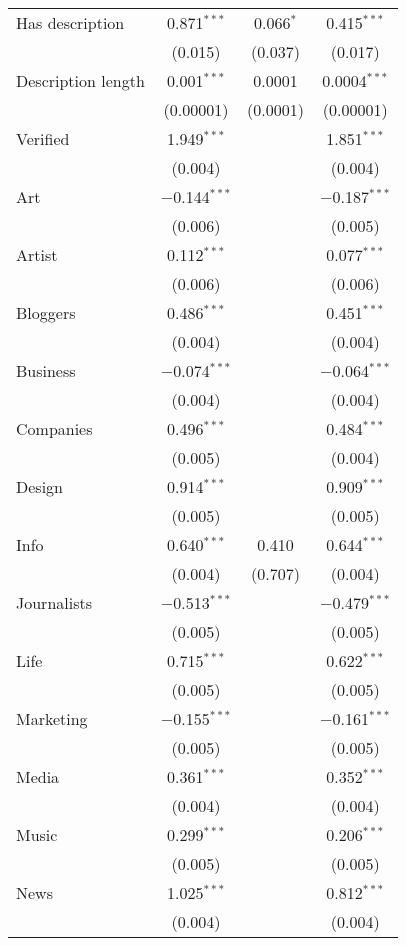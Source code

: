 \begin{table}[!htbp]
\begin{tabular}{@{\extracolsep{5pt}}lccc}
  Has description & 0.871$^{***}$ & 0.066$^{*}$ & 0.415$^{***}$ \\ 
  & (0.015) & (0.037) & (0.017) \\ 
  Description length & 0.001$^{***}$ & 0.0001 & 0.0004$^{***}$ \\ 
  & (0.00001) & (0.0001) & (0.00001) \\ 
  Verified & 1.949$^{***}$ &  & 1.851$^{***}$ \\ 
  & (0.004) &  & (0.004) \\ 
  Art & $-$0.144$^{***}$ &  & $-$0.187$^{***}$ \\ 
  & (0.006) &  & (0.005) \\ 
  Artist & 0.112$^{***}$ &  & 0.077$^{***}$ \\ 
  & (0.006) &  & (0.006) \\ 
  Bloggers & 0.486$^{***}$ &  & 0.451$^{***}$ \\ 
  & (0.004) &  & (0.004) \\ 
  Business & $-$0.074$^{***}$ &  & $-$0.064$^{***}$ \\ 
  & (0.004) &  & (0.004) \\ 
  Companies & 0.496$^{***}$ &  & 0.484$^{***}$ \\ 
  & (0.005) &  & (0.004) \\ 
  Design & 0.914$^{***}$ &  & 0.909$^{***}$ \\ 
  & (0.005) &  & (0.005) \\ 
  Info & 0.640$^{***}$ & 0.410 & 0.644$^{***}$ \\ 
  & (0.004) & (0.707) & (0.004) \\ 
  Journalists & $-$0.513$^{***}$ &  & $-$0.479$^{***}$ \\ 
  & (0.005) &  & (0.005) \\ 
  Life & 0.715$^{***}$ &  & 0.622$^{***}$ \\ 
  & (0.005) &  & (0.005) \\ 
  Marketing & $-$0.155$^{***}$ &  & $-$0.161$^{***}$ \\ 
  & (0.005) &  & (0.005) \\ 
  Media & 0.361$^{***}$ &  & 0.352$^{***}$ \\ 
  & (0.004) &  & (0.004) \\ 
  Music & 0.299$^{***}$ &  & 0.206$^{***}$ \\ 
  & (0.005) &  & (0.005) \\ 
  News & 1.025$^{***}$ &  & 0.812$^{***}$ \\ 
  & (0.004) &  & (0.004) \\ 

\end{tabular}
\end{table}
